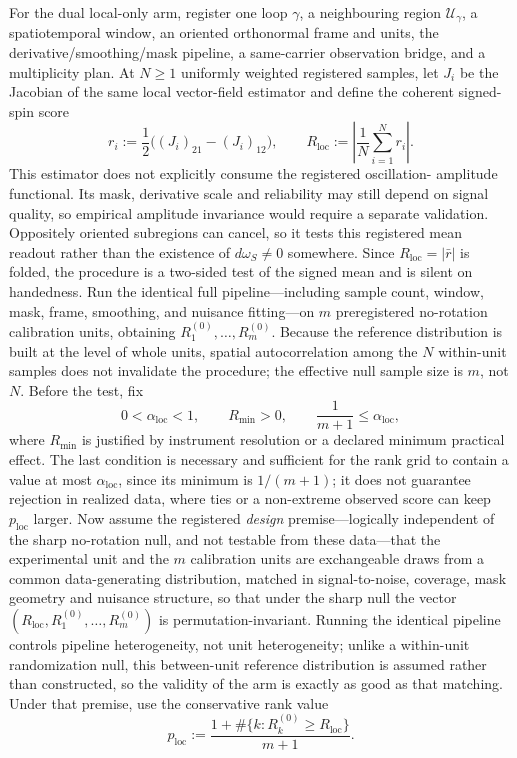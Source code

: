 \documentclass[11pt]{article}
\theoremstyle{definition}
\begin{document}
For the dual local-only arm, register one loop \(\gamma\), a neighbouring
region \(\mathcal U_\gamma\), a spatiotemporal window, an oriented
orthonormal frame and units, the derivative/smoothing/mask pipeline, a
same-carrier observation bridge, and a multiplicity plan.  At \(N\ge1\)
uniformly weighted registered samples, let \(J_i\) be the Jacobian of the
same local vector-field estimator and define the coherent signed-spin score
\[
r_i:=\frac12\bigl((J_i)_{21}-(J_i)_{12}\bigr),
\qquad
R_{\mathrm{loc}}:=\left|\frac1N\sum_{i=1}^N r_i\right|.
\]
This estimator does not explicitly consume the registered oscillation-
amplitude functional.  Its mask, derivative scale and reliability may still
depend on signal quality, so empirical amplitude invariance would require a
separate validation.  Oppositely oriented subregions can cancel, so it tests
this registered mean
readout rather than the existence of \(d\omega_S\ne0\) somewhere.  Since
\(R_{\mathrm{loc}}=|\bar r|\) is folded, the procedure is a two-sided test
of the signed mean and is silent on handedness.  Run the
identical full pipeline---including sample count, window, mask, frame,
smoothing, and nuisance fitting---on \(m\) preregistered no-rotation
calibration units, obtaining \(R_1^{(0)},\ldots,R_m^{(0)}\).  Because the
reference distribution is built at the level of whole units, spatial
autocorrelation among the \(N\) within-unit samples does not invalidate the
procedure; the effective null sample size is \(m\), not \(N\).  Before the
test, fix
\[
0<\alpha_{\mathrm{loc}}<1,
\qquad R_{\min}>0,
\qquad \frac1{m+1}\le\alpha_{\mathrm{loc}},
\]
where \(R_{\min}\) is justified by instrument resolution or a declared
minimum practical effect.  The last condition is necessary and sufficient
for the rank grid to contain a value at most
\(\alpha_{\mathrm{loc}}\), since its minimum is \(1/(m+1)\); it does not
guarantee rejection in realized data, where ties or a non-extreme observed
score can keep \(p_{\mathrm{loc}}\) larger.  Now assume the registered \emph{design} premise---logically
independent of the sharp no-rotation null, and not testable from these
data---that the experimental unit and the \(m\) calibration units are
exchangeable draws from a common data-generating distribution, matched in
signal-to-noise, coverage, mask geometry and nuisance structure, so that
under the sharp null the vector
\((R_{\mathrm{loc}},R_1^{(0)},\ldots,R_m^{(0)})\) is permutation-invariant.
Running the identical pipeline controls pipeline heterogeneity, not unit
heterogeneity; unlike a within-unit randomization null, this between-unit
reference distribution is assumed rather than constructed, so the
validity of the arm is exactly as good as that matching.  Under that
premise, use the conservative rank value
\[
p_{\mathrm{loc}}
:=\frac{1+\#\{k:R_k^{(0)}\ge R_{\mathrm{loc}}\}}{m+1}.
\]
\end{document}
